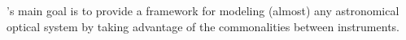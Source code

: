 \ScopeSim{}'s main goal is to provide a framework for modeling
(almost) any astronomical optical system by taking advantage of the
commonalities between instruments.



